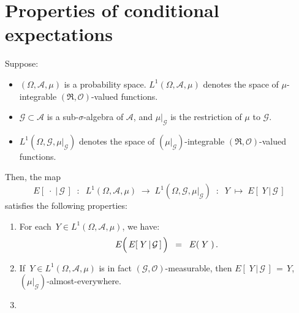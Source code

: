 

\section{Properties of conditional expectations}
\setcounter{theorem}{0}
\setcounter{equation}{0}

\renewcommand{\theenumi}{\roman{enumi}}
\renewcommand{\labelenumi}{\textnormal{(\theenumi)}$\;\;$}


\begin{theorem}
\label{Thm:PropertiesConditionalExpectation}
\mbox{}\vskip 0.2cm
\noindent
Suppose:
\begin{itemize}
\item
	$(\Omega,\mathcal{A},\mu)$ is a probability space.
	$L^{1}\!\left(\Omega,\mathcal{A},\mu\right)$ denotes the space of $\mu$-integrable $(\Re,\mathcal{O})$-valued functions.
\item
	$\mathcal{G} \subset \mathcal{A}$ is a sub-$\sigma$-algebra of $\mathcal{A}$,
	and $\mu\vert_{\mathcal{G}}$ is the restriction of $\mu$ to $\mathcal{G}$.
\item
	$L^{1}\!\left(\Omega,\mathcal{G},\mu\vert_{\mathcal{G}}\right)$ denotes the space of
	$(\mu\vert_{\mathcal{G}})$-integrable $(\Re,\mathcal{O})$-valued functions.
\end{itemize}
Then, the map
\begin{equation*}
E\!\left[\;\cdot\;\vert\,\mathcal{G}\,\right]
\;\; :\;\;
L^{1}\!\left(\Omega,\mathcal{A},\mu\right) \;\longrightarrow\; L^{1}\!\left(\Omega,\mathcal{G},\mu\vert_{\mathcal{G}}\right)
\;\; : \;\;
Y \;\longmapsto\; E\!\left[\;Y\,\vert\,\mathcal{G}\,\right]
\end{equation*}
satisfies the following properties:
\begin{enumerate}
\item
	For each \,$Y \in L^{1}\!\left(\Omega,\mathcal{A},\mu\right)$, we have:
	\begin{equation*}
	E\!\left(\,\overset{{\color{white}.}}{E}\!\left[\;Y\,\vert\,\mathcal{G}\,\right]\,\right)
	\;\; = \;\;
	E\!\left(\;Y\;\right).
	\end{equation*}
\item
	If \,$Y \in L^{1}\!\left(\Omega,\mathcal{A},\mu\right)$
	is in fact $(\mathcal{G},\mathcal{O})$-measurable,
	then $E\!\left[\;Y\,\vert\,\mathcal{G}\,\right] \,=\, Y$,
	$(\mu\vert_{\mathcal{G}})$-almost-everywhere.
\item\label{ConditionalExpectationRLinearity}

\end{enumerate}
\end{theorem}
